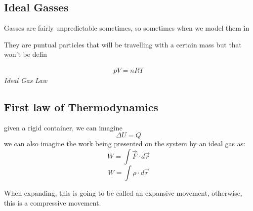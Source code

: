 \documentclass[11pt,fleqn]{book} %
\begin{document}
\section{Ideal Gasses}

Gasses are fairly unpredictable sometimes, so sometimes when we model them in 

They are puntual particles that will be travelling with a certain mass but that won't be defin

\begin{center}
    \begin{gather}
        pV = nRT
    \end{gather}
    \textit{Ideal Gas Law}
\end{center}

\section{First law of Thermodynamics}

given a rigid container, we can imagine
$$\Delta U = Q$$
we can also imagine the work being presented on the system by an ideal gas as:
$$W = \int \vec{F} \cdot d\vec{r}$$
$$W = \int \rho \cdot d\vec{r}$$

When expanding, this is going to be called an expansive movement, otherwise, this is a 
compressive movement. 

\chapter{}


\printbibliography
\end{document}
